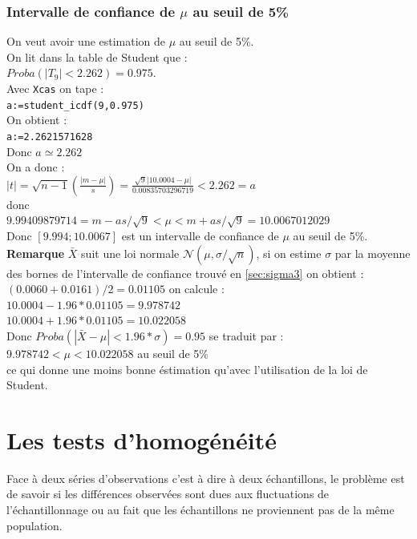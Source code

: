 \documentclass[a4paper,11pt]{book}
\begin{document}
\subsubsection{Intervalle de confiance de $\mu$ au  seuil de 5\%} 
On veut avoir une estimation de $\mu$ au  seuil de 5\%.\\
On lit dans la table de Student que :\\
$Proba(|T_9|<2.262)=0.975$. \\
Avec {\tt Xcas} on tape :\\
{\tt a:=student\_icdf(9,0.975)}\\
On obtient :\\
{\tt a:=2.2621571628}\\
Donc $a\simeq 2.262$\\
On a donc :\\
$\displaystyle |t|=\sqrt{n-1}(\frac{|m-\mu|}{s})=\frac{\sqrt{9}|10.0004-\mu|}{0.00835703296719}<2.262=a$\\
donc \\
$9.99409879714=m-as/\sqrt{9}<\mu<m+as/\sqrt{9}=10.0067012029$\\
Donc $[9.994;10.0067]$ est un intervalle de confiance de $\mu$ au  seuil de 
5\%.\\
{\bf Remarque} $\bar X$ suit une loi normale $\mathcal N(\mu,\sigma/\sqrt n)$, 
si on estime $\sigma$ par la moyenne des bornes de l'intervalle de confiance 
trouv\'e en \ref{sec:sigma3}  on obtient :\\
$(0.0060+0.0161)/2=0.01105$ on calcule :\\
$10.0004-1.96*0.01105=9.978742$\\
$10.0004+1.96*0.01105=10.022058$\\
Donc $Proba(|\bar X-\mu|<1.96*\sigma)=0.95$ se traduit par :\\
$9.978742<\mu<10.022058$  au seuil de 5\%\\
ce qui donne une moins bonne \'estimation qu'avec l'utilisation de la loi de 
Student.
\section{Les tests d'homog\'en\'eit\'e}
Face \`a deux s\'eries d'observations c'est \`a dire \`a deux \'echantillons,
le probl\`eme est de savoir si les diff\'erences observ\'ees sont dues aux
 fluctuations de l'\'echantillonnage ou au fait que les \'echantillons ne 
proviennent pas de la m\^eme population.  
\end{document}
